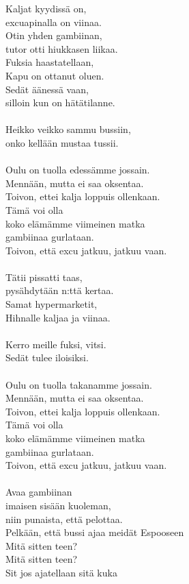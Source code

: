 
Kaljat kyydissä on, \\ excuapinalla on viinaa. \\ Otin yhden gambiinan, \\ tutor otti hiukkasen liikaa. \\ Fuksia haastatellaan, \\ Kapu on ottanut oluen. \\ Sedät äänessä vaan, \\ silloin kun on hätätilanne. \\ \hspace{10mm} \\ Heikko veikko sammu bussiin, \\ onko kellään mustaa tussii. \\ \hspace{10mm} \\ Oulu on tuolla edessämme jossain. \\ Mennään, mutta ei saa oksentaa. \\ Toivon, ettei kalja loppuis ollenkaan. \\ Tämä voi olla \\ koko elämämme viimeinen matka \\ gambiinaa gurlataan. \\ Toivon, että excu jatkuu, jatkuu vaan. \\ \hspace{10mm} \\ Tätii pissatti taas, \\ pysähdytään n:ttä kertaa. \\ Samat hypermarketit, \\ Hihnalle kaljaa ja viinaa. \\ \hspace{10mm} \\ Kerro meille fuksi, vitsi. \\ Sedät tulee iloisiksi. \\ \hspace{10mm} \\ Oulu on tuolla takanamme jossain. \\ Mennään, mutta ei saa oksentaa. \\ Toivon, ettei kalja loppuis ollenkaan. \\ Tämä voi olla \\ koko elämämme viimeinen matka \\ gambiinaa gurlataan. \\ Toivon, että excu jatkuu, jatkuu vaan. \\ \hspace{10mm} \\ Avaa gambiinan \\ imaisen sisään kuoleman, \\ niin punaista, että pelottaa. \\ Pelkään, että bussi ajaa meidät Espooseen \\ Mitä sitten teen? \\ Mitä sitten teen? \\ Sit jos ajatellaan sitä kuka 